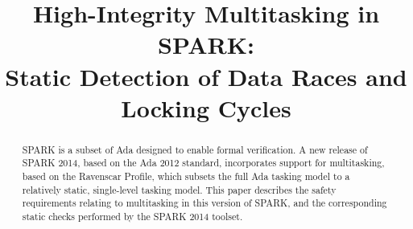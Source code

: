 \documentclass[conference,compsoc]{IEEEtran}
\begin{document}
\title{High-Integrity Multitasking in SPARK:\\
  Static Detection of Data Races and Locking Cycles}

\author{
\and
{}
\and
{}
}

\maketitle

%
%

\begin{abstract}
  SPARK is a subset of Ada designed to enable formal verification. A new
  release of SPARK 2014, based on the Ada 2012 standard, incorporates
  support for multitasking, based on the Ravenscar Profile, which subsets
  the full Ada tasking model to a relatively static, single-level tasking
  model. This paper describes the safety requirements relating to
  multitasking in this version of SPARK, and the corresponding static
  checks performed by the SPARK 2014 toolset.
\end{abstract}


%





\end{document}
